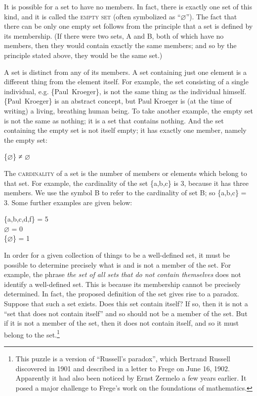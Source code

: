 It is possible for a set to have no members. In fact, there is exactly one set of this kind, and it is called the \textsc{empty set} (often symbolized as “⌀”). The fact that there can be only one empty set follows from the principle that a set is defined by its membership. (If there were two sets, A and B, both of which have no members, then they would contain exactly the same members; and so by the principle stated above, they would be the same set.)



A set is distinct from any of its members. A set containing just one element is a different thing from the element itself. For example, the set consisting of a single individual, e.g. \{Paul~Kroeger\}, is not the same thing as the individual himself. \{Paul~Kroeger\} is an abstract concept, but Paul Kroeger is (at the time of writing) a living, breathing human being. To take another example, the empty set is not the same as nothing; it is a set that contains nothing. And the set containing the empty set is not itself empty; it has exactly one member, namely the empty set:


\ea
  \{⌀\} ≠ ⌀
\z


The \textsc{cardinality} of a set is the number of members or elements which belong to that set. For example, the cardinality of the set \{a,b,c\} is 3, because it has three members. We use the symbol {\textbar}B{\textbar} to refer to the cardinality of set B; so {\textbar}\{a,b,c\}{\textbar} = 3. Some further examples are given below:


\ea
{\textbar}\{a,b,c,d,f\}{\textbar} = 5\\
{\textbar}⌀{\textbar} = 0\\
{\textbar}\{⌀\}{\textbar} = 1
\z


In order for a given collection of things to be a well-defined set, it must be possible to determine precisely what is and is not a member of the set. For example, the phrase \textit{the set of all sets that do not contain themselves} does not identify a well-defined set. This is because its membership cannot be precisely determined. In fact, the proposed definition of the set gives rise to a paradox. Suppose that such a set exists. Does this set contain itself? If so, then it is not a “set that does not contain itself” and so should not be a member of the set. But if it is not a member of the set, then it does not contain itself, and so it must belong to the set.\footnote{This puzzle is a version of “Russell’s paradox”, which Bertrand Russell discovered in 1901 and described in a letter to Frege on June 16, 1902. Apparently it had also been noticed by Ernst Zermelo a few years earlier. It posed a major challenge to Frege’s work on the foundations of mathematics.}



